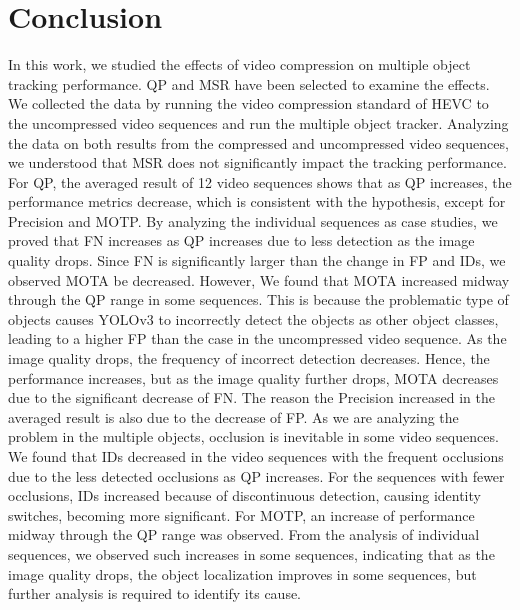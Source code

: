 \chapter{Conclusion}
\label{chap:conclusion}

In this work, we studied the effects of video compression on multiple object tracking performance. QP and MSR have been selected to examine the effects. We collected the data by running the video compression standard of HEVC to the uncompressed video sequences and run the multiple object tracker. Analyzing the data on both results from the compressed and uncompressed video sequences, we understood that MSR does not significantly impact the tracking performance. For QP, the averaged result of 12 video sequences shows that as QP increases, the performance metrics decrease, which is consistent with the hypothesis, except for Precision and MOTP. By analyzing the individual sequences as case studies, we proved that FN increases as QP increases due to less detection as the image quality drops. Since FN is significantly larger than the change in FP and IDs, we observed MOTA be decreased. However, We found that MOTA increased midway through the QP range in some sequences. This is because the problematic type of objects causes YOLOv3 to incorrectly detect the objects as other object classes, leading to a higher FP than the case in the uncompressed video sequence. As the image quality drops, the frequency of incorrect detection decreases. Hence, the performance increases, but as the image quality further drops, MOTA decreases due to the significant decrease of FN. The reason the Precision increased in the averaged result is also due to the decrease of FP. As we are analyzing the problem in the multiple objects, occlusion is inevitable in some video sequences. We found that IDs decreased in the video sequences with the frequent occlusions due to the less detected occlusions as QP increases. For the sequences with fewer occlusions, IDs increased because of discontinuous detection, causing identity switches, becoming more significant. For MOTP, an increase of performance midway through the QP range was observed. From the analysis of individual sequences, we observed such increases in some sequences, indicating that as the image quality drops, the object localization improves in some sequences, but further analysis is required to identify its cause.

